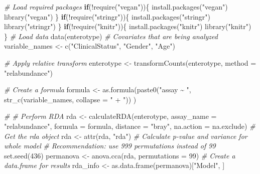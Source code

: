\documentclass[
]{book}
\newenvironment{Shaded}{\begin{snugshade}}{\end{snugshade}}
\newcommand{\AttributeTok}[1]{\textcolor[rgb]{0.77,0.63,0.00}{#1}}
\newcommand{\CommentTok}[1]{\textcolor[rgb]{0.56,0.35,0.01}{\textit{#1}}}
\newcommand{\ControlFlowTok}[1]{\textcolor[rgb]{0.13,0.29,0.53}{\textbf{#1}}}
\newcommand{\DecValTok}[1]{\textcolor[rgb]{0.00,0.00,0.81}{#1}}
\newcommand{\FunctionTok}[1]{\textcolor[rgb]{0.00,0.00,0.00}{#1}}
\newcommand{\NormalTok}[1]{#1}
\newcommand{\OtherTok}[1]{\textcolor[rgb]{0.56,0.35,0.01}{#1}}
\newcommand{\SpecialCharTok}[1]{\textcolor[rgb]{0.00,0.00,0.00}{#1}}
\newcommand{\StringTok}[1]{\textcolor[rgb]{0.31,0.60,0.02}{#1}}
\begin{document}
\begin{Shaded}
\begin{Highlighting}[]
\CommentTok{\# Load required packages}
\ControlFlowTok{if}\NormalTok{(}\SpecialCharTok{!}\FunctionTok{require}\NormalTok{(}\StringTok{"vegan"}\NormalTok{))\{}
    \FunctionTok{install.packages}\NormalTok{(}\StringTok{"vegan"}\NormalTok{)}
    \FunctionTok{library}\NormalTok{(}\StringTok{"vegan"}\NormalTok{)}
\NormalTok{\}}
\ControlFlowTok{if}\NormalTok{(}\SpecialCharTok{!}\FunctionTok{require}\NormalTok{(}\StringTok{"stringr"}\NormalTok{))\{}
    \FunctionTok{install.packages}\NormalTok{(}\StringTok{"stringr"}\NormalTok{)}
    \FunctionTok{library}\NormalTok{(}\StringTok{"stringr"}\NormalTok{)}
\NormalTok{\}}
\ControlFlowTok{if}\NormalTok{(}\SpecialCharTok{!}\FunctionTok{require}\NormalTok{(}\StringTok{"knitr"}\NormalTok{))\{}
    \FunctionTok{install.packages}\NormalTok{(}\StringTok{"knitr"}\NormalTok{)}
    \FunctionTok{library}\NormalTok{(}\StringTok{"knitr"}\NormalTok{)}
\NormalTok{\}}
\CommentTok{\# Load data}
\FunctionTok{data}\NormalTok{(enterotype)}
\CommentTok{\# Covariates that are being analyzed}
\NormalTok{variable\_names }\OtherTok{\textless{}{-}} \FunctionTok{c}\NormalTok{(}\StringTok{"ClinicalStatus"}\NormalTok{, }\StringTok{"Gender"}\NormalTok{, }\StringTok{"Age"}\NormalTok{)}

\CommentTok{\# Apply relative transform}
\NormalTok{enterotype }\OtherTok{\textless{}{-}} \FunctionTok{transformCounts}\NormalTok{(enterotype, }\AttributeTok{method =} \StringTok{"relabundance"}\NormalTok{)}

\CommentTok{\# Create a formula}
\NormalTok{formula }\OtherTok{\textless{}{-}} \FunctionTok{as.formula}\NormalTok{(}\FunctionTok{paste0}\NormalTok{(}\StringTok{"assay \textasciitilde{} "}\NormalTok{, }\FunctionTok{str\_c}\NormalTok{(variable\_names, }\AttributeTok{collapse =} \StringTok{" + "}\NormalTok{)) )}

\CommentTok{\# \# Perform RDA}
\NormalTok{rda }\OtherTok{\textless{}{-}} \FunctionTok{calculateRDA}\NormalTok{(enterotype, }\AttributeTok{assay\_name =} \StringTok{"relabundance"}\NormalTok{,}
                    \AttributeTok{formula =}\NormalTok{ formula, }\AttributeTok{distance =} \StringTok{"bray"}\NormalTok{, }\AttributeTok{na.action =}\NormalTok{ na.exclude)}
\CommentTok{\# Get the rda object}
\NormalTok{rda }\OtherTok{\textless{}{-}} \FunctionTok{attr}\NormalTok{(rda, }\StringTok{"rda"}\NormalTok{)}
\CommentTok{\# Calculate p{-}value and variance for whole model}
\CommentTok{\# Recommendation: use 999 permutations instead of 99}
\FunctionTok{set.seed}\NormalTok{(}\DecValTok{436}\NormalTok{)}
\NormalTok{permanova }\OtherTok{\textless{}{-}} \FunctionTok{anova.cca}\NormalTok{(rda, }\AttributeTok{permutations =} \DecValTok{99}\NormalTok{)}
\CommentTok{\# Create a data.frame for results}
\NormalTok{rda\_info }\OtherTok{\textless{}{-}} \FunctionTok{as.data.frame}\NormalTok{(permanova)[}\StringTok{"Model"}\NormalTok{, ]}


\end{Highlighting}
\end{Shaded}
\end{document}
